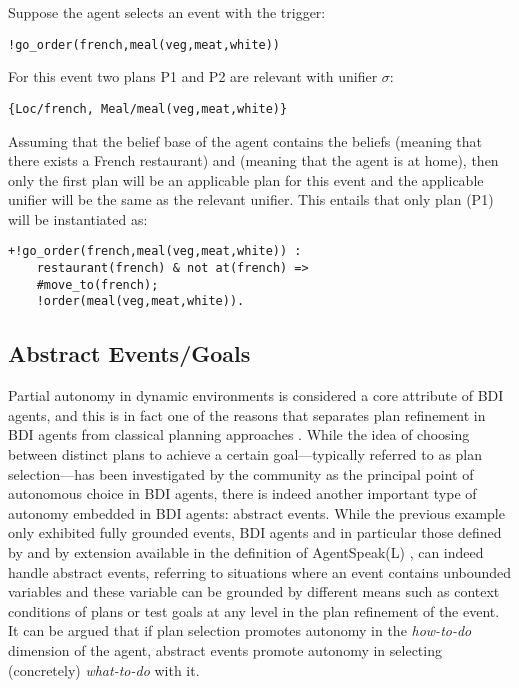\documentclass[sigconf,anonymous]{aamas}
\begin{document}
\noindent Suppose the agent selects an event with the trigger: 
\begin{verbatim}
!go_order(french,meal(veg,meat,white))
\end{verbatim}
For this event two plans P1 and P2 are relevant with unifier $\sigma$:
\begin{verbatim}
{Loc/french, Meal/meal(veg,meat,white)}
\end{verbatim}
Assuming that the belief base of the agent contains the beliefs  (meaning that there exists a French restaurant) and  (meaning that the agent is at home), then only the first plan will be an applicable plan for this event and the applicable unifier will be the same as the relevant unifier. This entails that only plan (P1) will be instantiated as: 
\begin{verbatim}
+!go_order(french,meal(veg,meat,white)) :
    restaurant(french) & not at(french) =>
    #move_to(french);
    !order(meal(veg,meat,white)).
\end{verbatim}


\subsection{Abstract Events/Goals}
Partial autonomy in dynamic environments is considered a core attribute of BDI agents, and this is in fact one of the reasons that separates plan refinement in BDI agents from classical planning approaches \cite{DeSilva2004}. While the idea of choosing between distinct plans to achieve a certain goal---typically referred to as plan selection---has been investigated by the community as the principal point of autonomous choice in BDI agents, there is indeed another important type of autonomy embedded in BDI agents: abstract events. While the previous example only exhibited fully grounded events, BDI agents and in particular those defined by \cite{Rao1995} and by extension available in the definition of AgentSpeak(L) \cite{RaoAS1996}, can indeed handle abstract events, referring to situations where an event contains unbounded variables and these variable can be grounded by different means such as context conditions of plans or test goals at any level in the plan refinement of the event. It can be argued that if plan selection promotes autonomy in the \textit{how-to-do} dimension of the agent, abstract events promote autonomy in selecting (concretely) \textit{what-to-do} with it.
\end{document}
